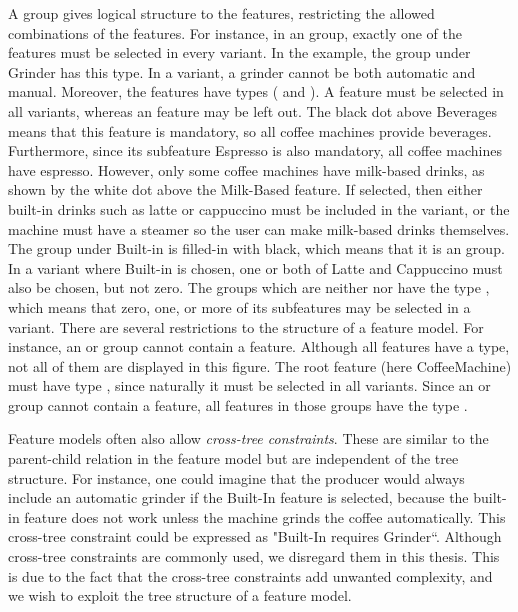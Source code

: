 A group gives logical structure to the features, restricting the allowed combinations of the features. For instance, in an \xortype group, exactly one of the features must be selected in every variant. In the example, the group under Grinder has this type. In a variant, a grinder cannot be both automatic and manual. Moreover, the features have types (\optional{} and \mandatory{}). A \mandatory{} feature must be selected in all variants, whereas an \optional{} feature may be left out. The black dot above Beverages means that this feature is mandatory, so all coffee machines provide beverages. Furthermore, since its subfeature Espresso is also mandatory, all coffee machines have espresso. However, only some coffee machines have milk-based drinks, as shown by the white dot above the Milk-Based feature. If selected, then either built-in drinks such as latte or cappuccino must be included in the variant, or the machine must have a steamer so the user can make milk-based drinks themselves. The group under Built-in is filled-in with black, which means that it is an \ortype{} group. In a variant where Built-in is chosen, one or both of Latte and Cappuccino must also be chosen, but not zero. The groups which are neither \xortype{} nor \ortype{} have the type \andtype{}, which means that zero, one, or more of its subfeatures may be selected in a variant. There are several restrictions to the structure of a feature model. For instance, an \xortype{} or \ortype{} group cannot contain a \mandatory{} feature. Although all features have a type, not all of them are displayed in this figure. The root feature (here CoffeeMachine) must have type \mandatory{}, since naturally it must be selected in all variants. Since an \xortype{} or \ortype{} group cannot contain a \mandatory{} feature, all features in those groups have the type \optional{}.

Feature models often also allow \emph{cross-tree constraints}. These are similar to the parent-child relation in the feature model but are independent of the tree structure. For instance, one could imagine that the producer would always include an automatic grinder if the Built-In feature is selected, because the built-in feature does not work unless the machine grinds the coffee automatically. This cross-tree constraint could be expressed as "Built-In requires Grinder``. Although cross-tree constraints are commonly used, we disregard them in this thesis. This is due to the fact that the cross-tree constraints add unwanted complexity, and we wish to exploit the tree structure of a feature model.

